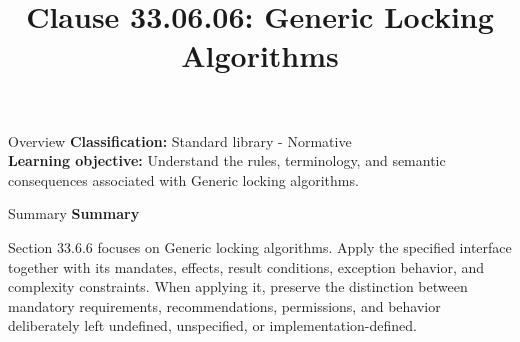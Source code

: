 \documentclass[10pt,letterpaper]{article}
\title{Clause 33.06.06: Generic Locking Algorithms}
\author{}
\date{}
\begin{document}
\maketitle
\begin{CornellOverviewBox}{Overview}
\textbf{Classification:} Standard library - Normative\\[2pt]
\textbf{Learning objective:} Understand the rules, terminology, and semantic consequences associated with Generic locking algorithms.
\end{CornellOverviewBox}\begin{CornellSummaryBox}{Summary}
{\sffamily\bfseries\color{Accent} Summary}\par\vspace{3pt}Section 33.6.6 focuses on Generic locking algorithms. Apply the specified interface together with its mandates, effects, result conditions, exception behavior, and complexity constraints. When applying it, preserve the distinction between mandatory requirements, recommendations, permissions, and behavior deliberately left undefined, unspecified, or implementation-defined.
\end{CornellSummaryBox}
\end{document}
